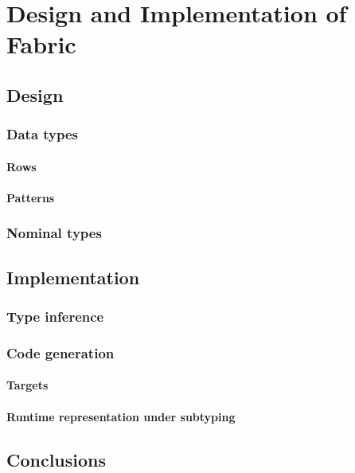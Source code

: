 \chapter{Design and Implementation of Fabric}
\label{fabric}

\section{Design}

\cite{mlstruct, forsythe, pizza-java}

\subsection{Data types}

\cite{dolan-thesis, mlstruct}

\subsubsection{Rows}

\subsubsection{Patterns}

\cite{parreaux-patterns}

\subsection{Nominal types} 

\cite{integrating-nominal-and-structural, structural-refinement-types}

\section{Implementation}

\subsection{Type inference} 

\cite{pottier-framework}

\subsection{Code generation} 

\subsubsection{Targets}

\subsubsection{Runtime representation under subtyping}

\cite{remy-extensible-records, tapl, binaryen}

\section{Conclusions}
